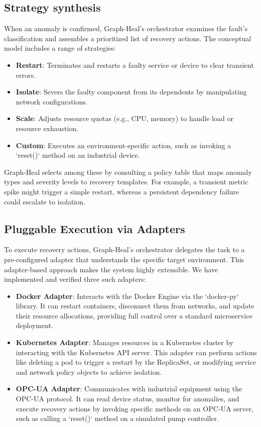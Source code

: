\documentclass[11pt,conference]{IEEEtran}
\begin{document}
\subsection{Strategy synthesis}
\label{sec:strategy-synthesis}

When an anomaly is confirmed, Graph-Heal's orchestrator examines the fault's classification and assembles a prioritized list of recovery actions. The conceptual model includes a range of strategies:

\begin{itemize}
    \item \textbf{Restart}: Terminates and restarts a faulty service or device to clear transient errors.
    \item \textbf{Isolate}: Severs the faulty component from its dependents by manipulating network configurations.
    \item \textbf{Scale}: Adjusts resource quotas (e.g., CPU, memory) to handle load or resource exhaustion.
    \item \textbf{Custom}: Executes an environment-specific action, such as invoking a `reset()` method on an industrial device.
\end{itemize}

Graph-Heal selects among these by consulting a policy table that maps anomaly types and severity levels to recovery templates. For example, a transient metric spike might trigger a simple restart, whereas a persistent dependency failure could escalate to isolation.

\subsection{Pluggable Execution via Adapters}
\label{sec:adapter-framework}

To execute recovery actions, Graph-Heal's orchestrator delegates the task to a pre-configured adapter that understands the specific target environment. This adapter-based approach makes the system highly extensible. We have implemented and verified three such adapters:

\begin{itemize}
    \item \textbf{Docker Adapter}: Interacts with the Docker Engine via the `docker-py` library. It can restart containers, disconnect them from networks, and update their resource allocations, providing full control over a standard microservice deployment.
    \item \textbf{Kubernetes Adapter}: Manages resources in a Kubernetes cluster by interacting with the Kubernetes API server. This adapter can perform actions like deleting a pod to trigger a restart by the ReplicaSet, or modifying service and network policy objects to achieve isolation.
    \item \textbf{OPC-UA Adapter}: Communicates with industrial equipment using the OPC-UA protocol. It can read device status, monitor for anomalies, and execute recovery actions by invoking specific methods on an OPC-UA server, such as calling a `reset()` method on a simulated pump controller.
\end{itemize}
\end{document}
